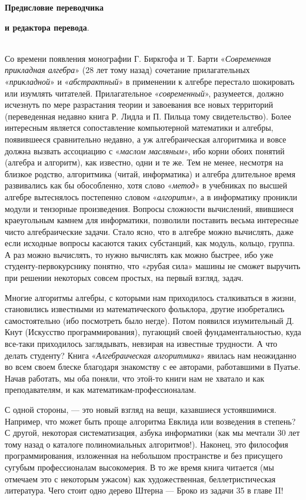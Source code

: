 \documentclass{mai_book}
\begin{document}
\hspace{2.0cm} {\Large \textbf {Предисловие переводчика}

\hspace{2.6cm} {\Large \textbf {и редактора перевода}.
\\\\

    \normalsize {Со времени появления монографии Г. Биркгофа и Т. Барти «\textit {Современная прикладная алгебра}» (28 лет тому назад) сочетание прилагательных «\textit {прикладной}» и «\textit {абстрактный}» в применении к алгебре перестало шокировать или изумлять читателей. Прилагательное «\textit {современный}», разумеется, должно исчезнуть по мере разрастания теории и завоевания все новых территорий (переведенная недавно книга Р. Лидла и П. Пильца тому свидетельство). Более интересным является сопоставление компьютерной математики и алгебры, появившееся сравнительно недавно, а уж алгебраическая алгоритмика и вовсе должна вызвать ассоциацию с «\textit {маслом масляным}», ибо корни обоих понятий (алгебра и алгоритм), как известно, одни и те же. Тем не менее, несмотря на близкое родство, алгоритмика (читай, информатика) и алгебра длительное время развивались как бы обособленно, хотя слово «\textit {метод}» в учебниках по высшей алгебре вытеснялось постепенно словом «\textit {алгоритм}», а в информатику проникли модули и тензорные произведения. Вопросы сложности вычислений, явившиеся краеугольным камнем для информатики, позволили поставить весьма интересные чисто алгебраические задачи. Стало ясно, что в алгебре можно вычислять, даже если исходные вопросы касаются таких субстанций, как модуль, кольцо, группа. А раз можно вычислять, то нужно вычислять как можно быстрее, ибо уже студенту-первокурснику понятно, что «\textit грубая сила» машины не сможет выручить при решении некоторых совсем простых, на первый взгляд, задач.
    
   Многие алгоритмы алгебры, с которыми нам приходилось сталкиваться в жизни, становились известными из математического фольклора, другие изобретались самостоятельно (ибо посмотреть было негде). Потом появился изумительный Д. Кнут (Искусство программирования), пугающий своей фундаментальностью, куда все-таки приходилось заглядывать, невзирая на известные трудности. А что делать студенту? Книга «\textit {Алгебраическая алгоритмика}» явилась нам неожиданно во всем своем блеске благодаря знакомству с ее авторами, работавшими в Пуатье. Начав работать, мы оба поняли, что этой-то книги нам не хватало и как преподавателям, и как математикам-профессионалам.}
\newpage 
\setcounter{page}{6}%
С одной стороны, — это новый взгляд на вещи, казавшиеся устоявшимися. Например, что может быть проще алгоритма Евклида или возведения в степень? С другой, некоторая систематизация, азбука информатики (как мы мечтали 30 лет тому назад о каталоге полиномиальных алгоритмов!). Наконец, это философия программирования, изложенная на небольшом пространстве и без присущего сугубым профессионалам высокомерия.
В то же время книга читается (мы отмечаем это с некоторым ужасом) как художественная, беллетристическая литература. Чего стоит одно дерево Штерна — Броко из задачи 35 в главе II!

}}
\end{document}
